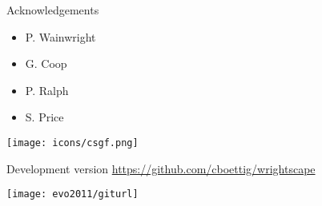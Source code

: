 \documentclass[final,hyperref={pdfpagelabels=false},xcolor=svgnames]{beamer}
\begin{document}
\begin{frame}[t]
\begin{columns}[t]
\begin{column}{.28\paperwidth}
  \vspace{.5in}

   {\LARGE Acknowledgements} \\
		\vspace{1cm}
		\normalsize{
    \begin{itemize}
      \item P. Wainwright
      \item G. Coop
      \item P. Ralph
      \item S. Price
    \end{itemize}

		  \texttt{[image: icons/csgf.png]}

      Development version 
\href{https://github.com/cboettig/wrightscape}{https://github.com/cboettig/wrightscape}

\vspace{-5in} \begin{flushright}\texttt{[image: evo2011/giturl]}\end{flushright}
		}

\end{column}
\end{columns}

\end{frame}
\end{document}
